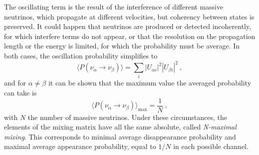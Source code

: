 The oscillating term is the result of the interference of different massive neutrinos, %
which propagate at different velocities, but coherency between states is preserved.
It could happen that neutrinos are produced or detected incoherently, for which interfere terms %
do not appear, or that the resolution on the propagation length or the energy is limited, %
for which the probability must be average.
In both cases, the oscillation probability simplifies to
\begin{equation}
	\label{eq:average_oscillation}
	\langle P(\nu_\alpha \to \nu_\beta)\rangle = \sum_{i} |U_{\alpha i}|^2 |U_{\beta i}|^2\ ,
\end{equation}
and for $\alpha \neq \beta$ it can be shown that the maximum value the averaged probability %
can take is 
\begin{equation}
	\langle P(\nu_\alpha \to \nu_\beta)\rangle_\text{max} = \frac{1}{N}\ ,
\end{equation}
with $N$ the number of massive neutrinos.
Under these circumstances, the elements of the mixing matrix have all the same absolute, called \emph{N-maximal mixing}.
This corresponds to minimal average disappearance probability and maximal %
average appearance probability, equal to $1/N$ in each possible channel.

